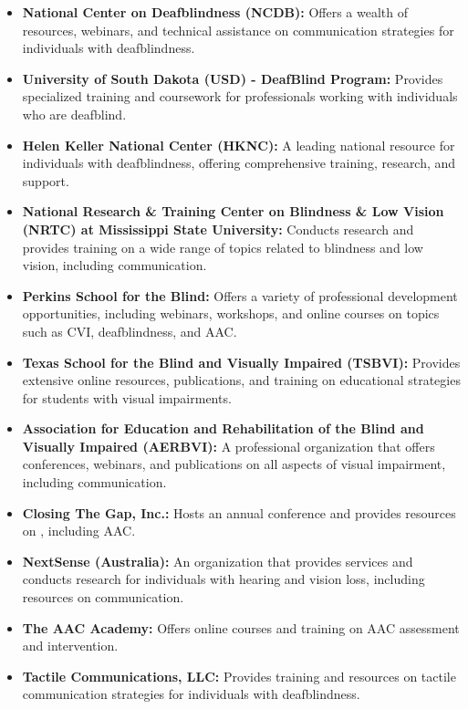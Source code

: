 \begin{itemize}
	\item \textbf{National Center on Deafblindness (NCDB):} Offers a wealth of resources, webinars, and technical assistance on communication strategies for individuals with deafblindness.
	\item \textbf{University of South Dakota (USD) - DeafBlind Program:} Provides specialized training and coursework for professionals working with individuals who are deafblind.
	\item \textbf{Helen Keller National Center (HKNC):} A leading national resource for individuals with deafblindness, offering comprehensive training, research, and support.
	\item \textbf{National Research \& Training Center on Blindness \& Low Vision (NRTC) at Mississippi State University:} Conducts research and provides training on a wide range of topics related to blindness and low vision, including communication.
	\item \textbf{Perkins School for the Blind:} Offers a variety of professional development opportunities, including webinars, workshops, and online courses on topics such as CVI, deafblindness, and AAC.
	\item \textbf{Texas School for the Blind and Visually Impaired (TSBVI):} Provides extensive online resources, publications, and training on educational strategies for students with visual impairments.
	\item \textbf{Association for Education and Rehabilitation of the Blind and Visually Impaired (AERBVI):} A professional organization that offers conferences, webinars, and publications on all aspects of visual impairment, including communication.
	\item \textbf{Closing The Gap, Inc.:} Hosts an annual conference and provides resources on , including AAC.
	\item \textbf{NextSense (Australia):} An organization that provides services and conducts research for individuals with hearing and vision loss, including resources on communication.
	\item \textbf{The AAC Academy:} Offers online courses and training on AAC assessment and intervention.
	\item \textbf{Tactile Communications, LLC:} Provides training and resources on tactile communication strategies for individuals with deafblindness.
\end{itemize}

